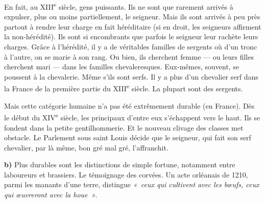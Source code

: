\documentclass[french,twoside]{book} %
\newcommand{\labelchar}[1]{\textbf{\color{rubric} #1}}
\begin{document}
\noindent En fait, au XIII\textsuperscript{e} siècle, gens puissants. Ils ne sont que rarement arrivés à expulser, plus ou moins partiellement, le seigneur. Mais ils sont arrivés à peu près partout à rendre leur charge en fait héréditaire (si en droit, les seigneurs affirment la non-hérédité). Ils sont si encombrants que parfois le seigneur leur rachète leurs charges. Grâce à l’hérédité, il y a de véritables familles de sergents où d’un tronc à l’autre, on se marie à son rang. Ou bien, ils cherchent femme — ou leurs filles cherchent mari — dans les familles chevaleresques. Eux-mêmes, souvent, se poussent à la chevalerie. Même s’ils sont serfs. Il y a plus d’un chevalier serf dans la France de la première partie du XIII\textsuperscript{e} siècle. La plupart sont des sergents.\par
Mais cette catégorie humaine n’a pas été extrêmement durable (en France). Dès le début du XIV\textsuperscript{e} siècle, les principaux d’entre eux s’échappent vers le haut. Ils se fondent dans la petite gentilhommerie. Et le nouveau clivage des classes met obstacle. Le Parlement sous saint Louis décide que le seigneur, qui fait son serf chevalier, par là même, bon gré mal gré, l’affranchit.\par
\bigbreak
\noindent \labelchar{b)} Plus durables sont les distinctions de simple fortune, notamment entre laboureurs et brassiers. Le témoignage des corvées. Un acte orléanais de 1210, parmi les manants d’une terre, distingue \emph{« ceux qui cultivent avec les bœufs, ceux qui œuvreront avec la houe »}.
\end{document}
